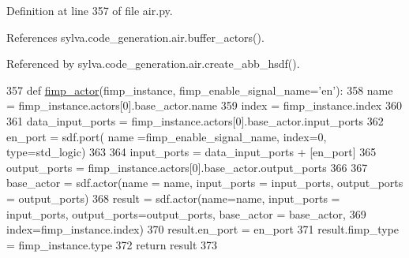 Definition at line 357 of file air.\+py.



References sylva.\+code\+\_\+generation.\+air.\+buffer\+\_\+actors().



Referenced by sylva.\+code\+\_\+generation.\+air.\+create\+\_\+abb\+\_\+hsdf().


\begin{DoxyCode}
357 \textcolor{keyword}{def }\hyperlink{namespacesylva_1_1code__generation_1_1air_a5a82ebeeb6def57b9dc6784ab9cd43f4}{fimp\_actor}(fimp\_instance, fimp\_enable\_signal\_name='en'):
358   name = fimp\_instance.actors[0].base\_actor.name
359   index = fimp\_instance.index
360 
361   data\_input\_ports = fimp\_instance.actors[0].base\_actor.input\_ports
362   en\_port = sdf.port( name =fimp\_enable\_signal\_name, index=0, type=std\_logic)
363 
364   input\_ports = data\_input\_ports + [en\_port]
365   output\_ports = fimp\_instance.actors[0].base\_actor.output\_ports
366 
367   base\_actor = sdf.actor(name = name, input\_ports = input\_ports, output\_ports = output\_ports)
368   result = sdf.actor(name=name, input\_ports = input\_ports, output\_ports=output\_ports, base\_actor = 
      base\_actor,
369     index=fimp\_instance.index)
370   result.en\_port = en\_port
371   result.fimp\_type = fimp\_instance.type
372   \textcolor{keywordflow}{return} result
373 
\end{DoxyCode}
\mbox{\label{namespacesylva_1_1code__generation_1_1air_a2ea6ae18c1f30dcbc16f01d32d092979}} 
